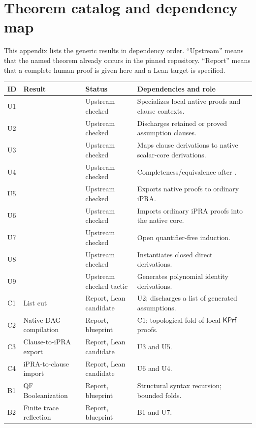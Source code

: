 \section{Theorem catalog and dependency map}

This appendix lists the generic results in dependency order.  ``Upstream'' means
that the named theorem already occurs in the pinned repository.  ``Report''
means that a complete human proof is given here and a Lean target is specified.

\begin{longtable}{L{0.08\textwidth}L{0.30\textwidth}L{0.16\textwidth}L{0.35\textwidth}}
\toprule
ID & Result & Status & Dependencies and role \\
\midrule
U1 &  & Upstream checked & Specializes local native proofs and clause contexts.\\
U2 &  & Upstream checked & Discharges retained or proved assumption clauses.\\
U3 &  & Upstream checked & Maps clause derivations to native scalar-core derivations.\\
U4 &  & Upstream checked & Completeness/equivalence after .\\
U5 &  & Upstream checked & Exports native proofs to ordinary iPRA.\\
U6 &  & Upstream checked & Imports ordinary iPRA proofs into the native core.\\
U7 &  & Upstream checked & Open quantifier-free induction.\\
U8 &  & Upstream checked & Instantiates closed direct derivations.\\
U9 &  & Upstream checked tactic & Generates polynomial identity derivations.\\
C1 & List cut & Report, Lean candidate & U2; discharges a list of generated assumptions.\\
C2 & Native DAG compilation & Report, blueprint & C1; topological fold of local \(\mathsf{KPrf}\) proofs.\\
C3 & Clause-to-iPRA export & Report, Lean candidate & U3 and U5.\\
C4 & iPRA-to-clause import & Report, Lean candidate & U6 and U4.\\
B1 & QF Booleanization & Report, blueprint & Structural syntax recursion; bounded folds.\\
B2 & Finite trace reflection & Report, blueprint & B1 and U7.\\

\end{longtable}
